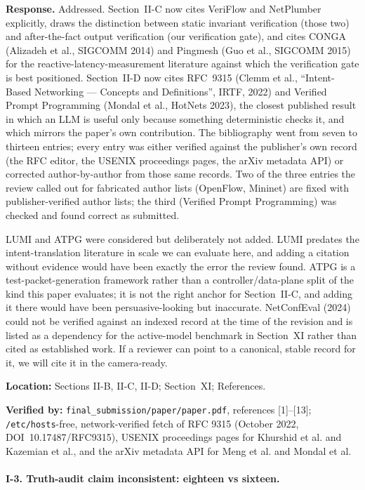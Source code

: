 \documentclass[11pt,a4paper]{article}
\begin{document}
\textbf{Response.} Addressed. Section~II-C now cites VeriFlow and NetPlumber
explicitly, draws the distinction between static invariant verification (those
two) and after-the-fact output verification (our verification gate), and cites
CONGA (Alizadeh et al., SIGCOMM 2014) and Pingmesh (Guo et al., SIGCOMM 2015)
for the reactive-latency-measurement literature against which the verification
gate is best positioned. Section~II-D now cites RFC~9315 (Clemm et al.,
``Intent-Based Networking --- Concepts and Definitions'', IRTF, 2022) and
Verified Prompt Programming (Mondal et al., HotNets 2023), the closest published
result in which an LLM is useful only because something deterministic checks it,
and which mirrors the paper's own contribution. The bibliography went from seven
to thirteen entries; every entry was either verified against the publisher's
own record (the RFC editor, the USENIX proceedings pages, the arXiv metadata
API) or corrected author-by-author from those same records. Two of the
three entries the review called out for fabricated author lists (OpenFlow,
Mininet) are fixed with publisher-verified author lists; the third
(Verified Prompt Programming) was checked and found correct as submitted.

LUMI and ATPG were considered but deliberately not added. LUMI predates the
intent-translation literature in scale we can evaluate here, and adding a
citation without evidence would have been exactly the error the review found.
ATPG is a test-packet-generation framework rather than a controller/data-plane
split of the kind this paper evaluates; it is not the right anchor for
Section~II-C, and adding it there would have been persuasive-looking but
inaccurate. NetConfEval (2024) could not be verified against an indexed record
at the time of the revision and is listed as a dependency for the active-model
benchmark in Section~XI rather than cited as established work. If a reviewer can
point to a canonical, stable record for it, we will cite it in the camera-ready.

\textbf{Location:} Sections II-B, II-C, II-D; Section~XI; References.

\textbf{Verified by:} \texttt{final\_submission/paper/paper.pdf}, references [1]--[13];
\texttt{/etc/hosts}-free, network-verified fetch of RFC 9315 (October 2022,
DOI~10.17487/RFC9315), USENIX proceedings pages for Khurshid et al. and Kazemian
et al., and the arXiv metadata API for Meng et al. and Mondal et al.

\paragraph{I-3. Truth-audit claim inconsistent: eighteen vs sixteen.}
\end{document}

